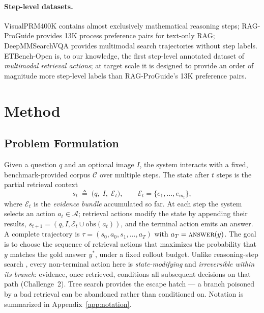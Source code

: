 \documentclass[letterpaper,twocolumn,10pt]{article}
\newcommand{\dataset}{ETBench-Open}
\begin{document}
\paragraph{Step-level datasets.}
VisualPRM400K \cite{visualprm2025} contains almost exclusively mathematical
reasoning steps; RAG-ProGuide \cite{zhang2025reasonrag} provides 13K
process preference pairs for text-only RAG; DeepMMSearchVQA
\cite{deepmmsearch2025} provides multimodal search trajectories without
step labels. \dataset{} is, to our knowledge, the first step-level annotated dataset
of \emph{multimodal retrieval actions}; at target scale it is designed to
provide an order of magnitude more step-level labels than RAG-ProGuide's
13K preference pairs.

\section{Method}
\label{sec:method}

\subsection{Problem Formulation}
\label{sec:formulation}

Given a question $q$ and an optional image $I$, the system interacts with a
fixed, benchmark-provided corpus $\mathcal{C}$ over multiple steps. The
state after $t$ steps is the partial retrieval context
\begin{equation}
s_t \;\triangleq\; \big(q,\; I,\; \mathcal{E}_t\big), \qquad
\mathcal{E}_t = \{e_1, \dots, e_{m_t}\},
\label{eq:state}
\end{equation}
where $\mathcal{E}_t$ is the \emph{evidence bundle} accumulated so far. At
each step the system selects an action $a_t \in \mathcal{A}$; retrieval
actions modify the state by appending their results,
$s_{t+1} = (q, I, \mathcal{E}_t \cup \mathrm{obs}(a_t))$, and the terminal
action emits an answer. A complete trajectory is
$\tau = (s_0, a_0, s_1, \dots, a_T)$ with $a_T = \textsc{answer}(y)$. The
goal is to choose the sequence of retrieval actions that maximizes the
probability that $y$ matches the gold answer $y^{*}$, under a fixed rollout
budget. Unlike reasoning-step search
\cite{dong2025armcts,visualprm2025}, every non-terminal action here is
\emph{state-modifying} and \emph{irreversible within its branch}: evidence,
once retrieved, conditions all subsequent decisions on that path
(Challenge~2). Tree search provides the escape hatch --- a branch poisoned
by a bad retrieval can be abandoned rather than conditioned on. Notation is summarized in
Appendix~\ref{app:notation}.
\end{document}
